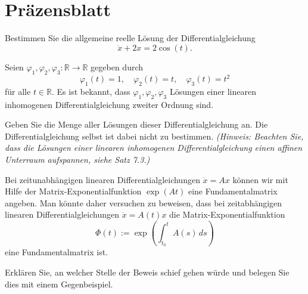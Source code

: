 	\newpage
	\section*{Präzensblatt}
	\begin{Problem}
		Bestimmen Sie die allgemeine reelle Lösung der Differentialgleichung
		\[
		\ddot{x} + 2x = 2\cos(t).
		\]
		\end{Problem}
		
		\begin{Problem}
			Seien $\varphi_1, \varphi_2, \varphi_3 : \mathbb{R} \to \mathbb{R}$ gegeben durch
			\[
			\varphi_1(t) = 1, \quad \varphi_2(t) = t, \quad \varphi_3(t) = t^2
			\]
			für alle $t \in \mathbb{R}$. Es ist bekannt, dass $\varphi_1, \varphi_2, \varphi_3$ Lösungen einer linearen inhomogenen Differentialgleichung zweiter Ordnung sind.
			
			Geben Sie die Menge aller Lösungen dieser Differentialgleichung an. Die Differentialgleichung selbst ist dabei nicht zu bestimmen.  
			\textit{(Hinweis: Beachten Sie, dass die Lösungen einer linearen inhomogenen Differentialgleichung einen affinen Unterraum aufspannen, siehe Satz 7.3.)}
		\end{Problem}
		
		\begin{Problem}
			Bei zeitunabhängigen linearen Differentialgleichungen $\dot{x} = Ax$ können wir mit Hilfe der Matrix-Exponentialfunktion $\exp(At)$ eine Fundamentalmatrix angeben. Man könnte daher versuchen zu beweisen, dass bei zeitabhängigen linearen Differentialgleichungen $\dot{x} = A(t)x$ die Matrix-Exponentialfunktion
			\[
			\Phi(t) := \exp\left( \int_{t_0}^t A(s) \, ds \right)
			\]
			eine Fundamentalmatrix ist.
			
			Erklären Sie, an welcher Stelle der Beweis schief gehen würde und belegen Sie dies mit einem Gegenbeispiel.
		\end{Problem}